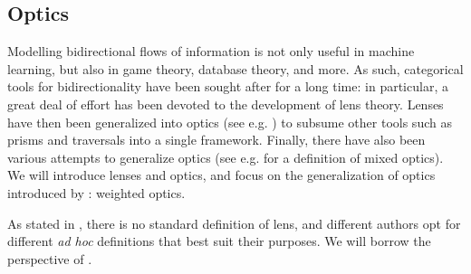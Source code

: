 \documentclass[11pt,a4paper,openright,twoside]{report}
\theoremstyle{plain}
\theoremstyle{definition}
\begin{document}
\subsection{Optics}

Modelling bidirectional flows of information is not only useful in machine learning, but also in game theory, database theory, and more. As such, categorical tools for bidirectionality have been sought after for a long time: in particular, a great deal of effort has been devoted to the development of lens theory. Lenses have then been generalized into optics (see e.g. \cite{riley2018categories}) to subsume other tools such as prisms and traversals into a single framework. Finally, there have also been various attempts to generalize optics (see e.g. \cite{clarke2024profunctor} for a definition of mixed optics). We will introduce lenses and optics, and focus on the generalization of optics introduced by \cite{gavranovic2024fundamental}: weighted optics. 


As stated in \cite{gavranovic2024fundamental}, there is no standard definition of lens, and different authors opt for different \textit{ad hoc} definitions that best suit their purposes. We will borrow the perspective of \cite{cruttwell2022categorical}.
\end{document}
